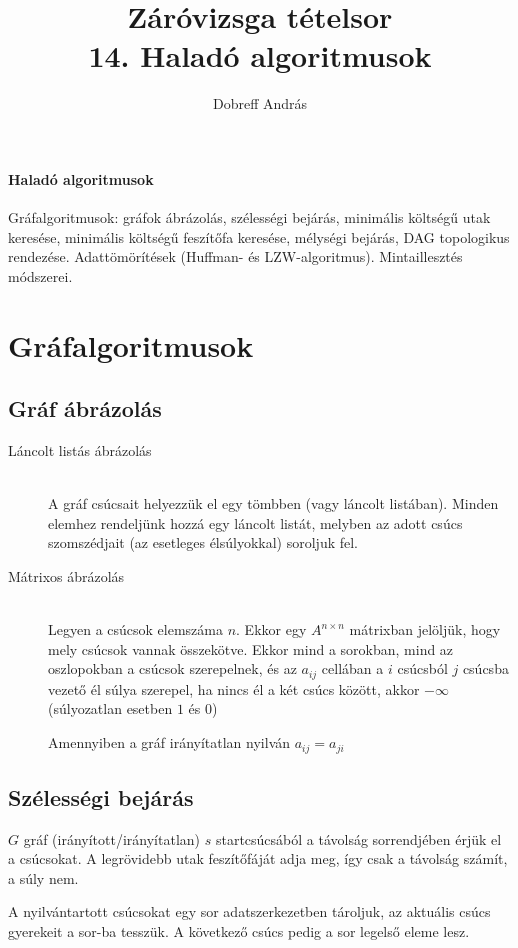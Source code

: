 \documentclass[margin=0px]{article}
\title{Záróvizsga tételsor \\ \large 14. Haladó algoritmusok}
\date{}
\author{Dobreff András}
\newenvironment{tetel}[1]{\paragraph{#1 \\}}{}
\begin{document}
	\maketitle
	
	\begin{tetel}{Haladó algoritmusok}
			Gráfalgoritmusok: gráfok ábrázolás, szélességi bejárás, minimális költségű utak keresése, minimális költségű feszítőfa keresése, mélységi bejárás, DAG topologikus rendezése. Adattömörítések (Huffman- és LZW-algoritmus). Mintaillesztés módszerei.
	\end{tetel}
	
	\section{Gráfalgoritmusok}
		\subsection{Gráf ábrázolás}
			\begin{description}
				\item[Láncolt listás ábrázolás] \hfill \\
					A gráf csúcsait helyezzük el egy tömbben (vagy láncolt listában). Minden elemhez rendeljünk hozzá egy láncolt listát, melyben az adott csúcs szomszédjait (az esetleges élsúlyokkal) soroljuk fel. 
				\item[Mátrixos ábrázolás] \hfill \\
						Legyen a csúcsok elemszáma $n$. Ekkor egy $A^{n\times n}$ mátrixban jelöljük, hogy mely csúcsok vannak összekötve. Ekkor mind a sorokban, mind az oszlopokban a csúcsok szerepelnek, és az $a_{ij}$ cellában a $i$ csúcsból $j$ csúcsba vezető él súlya szerepel, ha nincs él a két csúcs között, akkor $-\infty$ (súlyozatlan esetben $1$ és $0$)
						
						Amennyiben a gráf irányítatlan nyilván $a_{ij} = a_{ji}$
			\end{description}
		\subsection{Szélességi bejárás}
			$G$ gráf (irányított/irányítatlan) $s$ startcsúcsából a távolság sorrendjében érjük el a csúcsokat. A legrövidebb utak feszítőfáját adja meg, így csak a távolság számít, a súly nem.
			
			A nyilvántartott csúcsokat egy sor adatszerkezetben tároljuk, az aktuális csúcs gyerekeit a sor-ba tesszük. A következő csúcs pedig a sor legelső eleme lesz.
			
\end{document}
